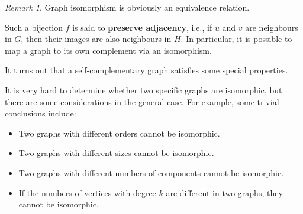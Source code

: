 \documentclass[math]{amznotes}
\makeatletter
\let\save@mathaccent\mathaccent
\newcommand*\if@single[3]{%
  \setbox0\hbox{${\mathaccent"0362{#1}}^H$}%
  \setbox2\hbox{${\mathaccent"0362{\kern0pt#1}}^H$}%
  \ifdim\ht0=\ht2 #3\else #2\fi
  }
\newcommand*\rel@kern[1]{\kern#1\dimexpr\macc@kerna}
\newcommand*\widebar[1]{\@ifnextchar^{{\wide@bar{#1}{0}}}{\wide@bar{#1}{1}}}
\newcommand*\wide@bar[2]{\if@single{#1}{\wide@bar@{#1}{#2}{1}}{\wide@bar@{#1}{#2}{2}}}
\newcommand*\wide@bar@[3]{%
  \begingroup
  \def\mathaccent##1##2{%
    \let\mathaccent\save@mathaccent
    \if#32 \let\macc@nucleus\first@char \fi
    \setbox\z@\hbox{$\macc@style{\macc@nucleus}_{}$}%
    \setbox\tw@\hbox{$\macc@style{\macc@nucleus}{}_{}$}%
    \dimen@\wd\tw@
    \advance\dimen@-\wd\z@
    \divide\dimen@ 3
    \@tempdima\wd\tw@
    \advance\@tempdima-\scriptspace
    \divide\@tempdima 10
    \advance\dimen@-\@tempdima
    \ifdim\dimen@>\z@ \dimen@0pt\fi
    \rel@kern{0.6}\kern-\dimen@
    \if#31
      \overline{\rel@kern{-0.6}\kern\dimen@\macc@nucleus\rel@kern{0.4}\kern\dimen@}%
      \advance\dimen@0.4\dimexpr\macc@kerna
      \let\final@kern#2%
      \ifdim\dimen@<\z@ \let\final@kern1\fi
      \if\final@kern1 \kern-\dimen@\fi
    \else
      \overline{\rel@kern{-0.6}\kern\dimen@#1}%
    \fi
  }%
  \macc@depth\@ne
  \let\math@bgroup\@empty \let\math@egroup\macc@set@skewchar
  \mathsurround\z@ \frozen@everymath{\mathgroup\macc@group\relax}%
  \macc@set@skewchar\relax
  \let\mathaccentV\macc@nested@a
  \if#31
    \macc@nested@a\relax111{#1}%
  \else
    \def\gobble@till@marker##1\endmarker{}%
    \futurelet\first@char\gobble@till@marker#1\endmarker
    \ifcat\noexpand\first@char A\else
      \def\first@char{}%
    \fi
    \macc@nested@a\relax111{\first@char}%
  \fi
  \endgroup
}
\theoremstyle{remark}
\newtheorem*{remark}{Remark}
\newcommand{\0}{\mathbf{0}}
\newcommand{\1}{\mathbf{1}}
\makeatother
\begin{document}
\begin{notebox}
    \begin{remark}
        Graph isomorphism is obviously an equivalence relation.
    \end{remark}
\end{notebox}
Such a bijection $f$ is said to \textbf{preserve adjacency}, i.e., if $u$ and $v$ are neighbours in $G$, then their images are also neighbours in $H$. In particular, it is possible to map a graph to its own complement via an isomorphism.
It turns out that a self-complementary graph satisfies some special properties.
It is very hard to determine whether two specific graphs are isomorphic, but there are some considerations in the general case. For example, some trivial conclusions include:
\begin{itemize}
    \item Two graphs with different orders cannot be isomorphic.
    \item Two graphs with different sizes cannot be isomorphic.
    \item Two graphs with different numbers of components cannot be isomorphic.
    \item If the numbers of vertices with degree $k$ are different in two graphs, they cannot be isomorphic.
\end{itemize}
\end{document}
